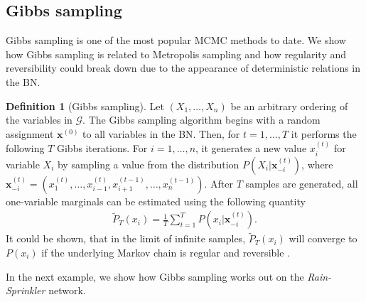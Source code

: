 \documentclass[a4paper, twoside, 11pt]{report}
\theoremstyle{plain}
\theoremstyle{definition}
\newtheorem{definition}[thm]{Definition}
\theoremstyle{remark}
\newcommand{\G}{{\mathcal G}}
\newcommand{\bfx}{{\mathbf{x}}}
\begin{document}
\subsection{Gibbs sampling}
Gibbs sampling \cite{geman1984stochastic} is one of the most popular MCMC methods to date.  We show how Gibbs sampling is related to Metropolis sampling and how regularity and reversibility could break down due to the appearance of deterministic relations in the BN.
\begin{definition}[Gibbs sampling]
Let $(X_1, \ldots , X_n)$ be an arbitrary ordering of the variables in $\G$. The Gibbs sampling algorithm begins with a random assignment $\bfx^{(0)}$ to all variables in the BN. Then, for $t = 1, \ldots, T$ it performs the following $T$ Gibbs iterations. For $i=1, \ldots, n$, it generates a new value $x_i^{(t)}$ for variable $X_i$ by sampling a value from the distribution $P(X_i | \bfx_{-i}^{(t)})$, where $\bfx_{-i}^{(t)} = (x_1^{(t)}, \ldots, x_{i-1}^{(t)}, x_{i+1}^{(t-1)}, \ldots, x_{n}^{(t-1)})$. After $T$ samples are generated, all one-variable marginals can be estimated using the following quantity
\begin{align}\label{eq:gibss}
\widetilde{P}_T(x_i) = \frac{1}{T} \sum_{t=1}^T P(x_i | \bfx_{-i}^{(t)} ).
\end{align}
It could be shown, that in the limit of infinite samples, $\widetilde{P}_T(x_i)$ will converge to $P(x_i)$ if the underlying Markov chain is regular and reversible \cite{venugopal2013giss}.
\end{definition}
In the next example, we show how Gibbs sampling works out on the \textit{Rain-Sprinkler} network.
\end{document}

